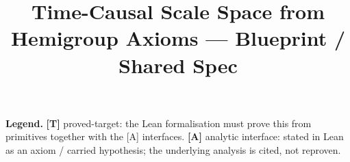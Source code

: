 \documentclass{report}
\title{Time-Causal Scale Space from Hemigroup Axioms --- Blueprint / Shared Spec}
\author{}
\begin{document}
\maketitle

\noindent\textbf{Legend.}\quad
\textbf{[T]} \textsf{proved-target}: the Lean formalisation must prove this from primitives together with
the [A] interfaces.\quad
\textbf{[A]} \textsf{analytic interface}: stated in Lean as an axiom / carried hypothesis; the underlying
analysis is cited, not reproven.


\end{document}

